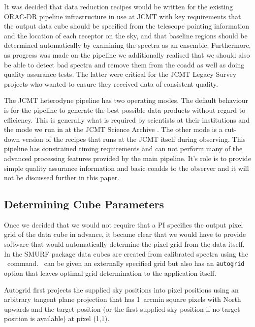 \documentclass[final,authoryear,5p,times,twocolumn]{elsarticle}
\begin{document}
It was decided that data reduction recipes would be written for the
existing ORAC-DR pipeline infrastructure in use at JCMT
\citep{2011tfa..confE..42J,2008AN....329..295C} with key requirements that
the output data cube should be specified from the telescope pointing
information and the location of each receptor on the sky, and that
baseline regions should be determined automatically by examining the
spectra as an ensemble. Furthermore, as progress was made on the
pipeline we additionally realised that we should also be able to
detect bad spectra and remove them from the coadd as well as doing
quality assurance tests. The latter were critical for the JCMT Legacy
Survey projects
\citep{2007PASP..119..855W,2009ApJ...693.1736W,2007PASP..119..102P}
who wanted to ensure they received data of consistent quality.

The JCMT heterodyne pipeline has two operating modes. The default
behaviour is for the pipeline to generate the best possible data
products without regard to efficiency. This is generally what is
required by scientists at their institutions and the mode we run in at
the JCMT Science Archive
\citep{2008ASPC..394..135G,2008ASPC..394..565J}. The other mode is a
cut-down version of the recipes that runs at the JCMT itself during
observing. This pipeline has constrained timing requirements and can
not perform many of the advanced processing features provided by the
main pipeline. It's role is to provide simple quality assurance
information and basic coadds to the observer and it will not be
discussed further in this paper.

\subsection{Determining Cube Parameters}
\label{sec:makecube}

Once we decided that we would not require that a PI specifies the
output pixel grid of the data cube in advance, it became clear that we
would have to provide software that would automatically determine the
pixel grid from the data itself. In the SMURF package data cubes are
created from calibrated spectra using the \makecube\
command. \makecube\ can be given an externally specified grid but also
has an \texttt{autogrid} option that leaves optimal grid determination
to the application itself.

Autogrid first projects the supplied sky positions into pixel
positions using an arbitrary tangent plane projection that has
1~arcmin square pixels with North upwards and the target position
(or the first supplied sky position if no target position is
available) at pixel (1,1).
\end{document}
